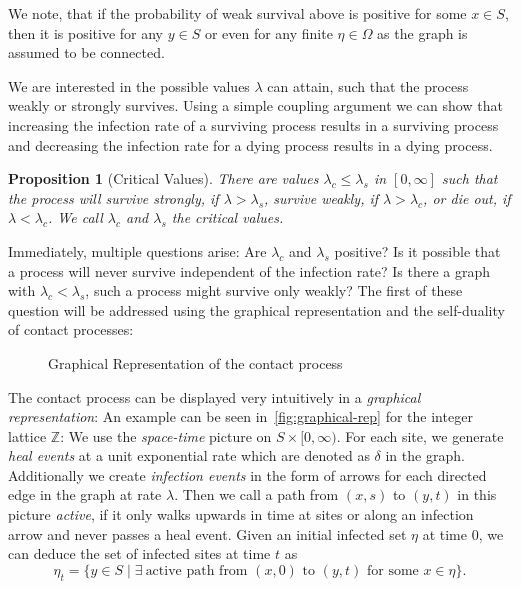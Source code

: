 \documentclass[a4paper,11pt]{amsart}
\theoremstyle{theorem}
\newtheorem{proposition}[theorem]{Proposition}
\theoremstyle{definition}
\newcommand{\Z}{\mathbb{Z}}
\begin{document}
We note, that if the probability of weak survival above is positive for some $x\in S$, then it is positive for any $y\in S$ or even for any finite $\eta \in \Omega$ as the graph is assumed to be connected.

We are interested in the possible values $\lambda$ can attain, such that the process weakly or strongly survives.
Using a simple coupling argument we can show that increasing the infection rate of a surviving process results in a surviving process and decreasing the infection rate for a dying process results in a dying process.

\begin{proposition}[Critical Values]
	There are values $\lambda_c \leq \lambda_s$ in $[0,\infty]$ such that the process will survive strongly, if $\lambda > \lambda_s$, survive weakly, if $\lambda > \lambda_c$, or die out, if $\lambda < \lambda_c$.
	We call $\lambda_c$ and $\lambda_s$ the \emph{critical values}.
\end{proposition}


Immediately, multiple questions arise:
Are $\lambda_c$ and $\lambda_s$ positive? Is it possible that a process will never survive independent of the infection rate?
Is there a graph with $\lambda_c < \lambda_s$, such a process might survive only weakly?
The first of these question will be addressed using the graphical representation and the self-duality of contact processes:

\begin{figure}[h]

\caption{Graphical Representation of the contact process}
\label{fig:graphical-rep}
\end{figure}

The contact process can be displayed very intuitively in a \emph{graphical representation}:
An example can be seen in~\autoref{fig:graphical-rep} for the integer lattice $\Z$:
We use the \emph{space-time} picture on $S\times [0,\infty)$. For each site, we generate \emph{heal events} at a unit exponential rate which are denoted as $\delta$ in the graph.
Additionally we create \emph{infection events} in the form of arrows for each directed edge in the graph at rate $\lambda$.
Then we call a path from $(x,s)$ to $(y,t)$ in this picture \emph{active}, if it only walks upwards in time at sites or along an infection arrow and never passes a heal event.
Given an initial infected set $\eta$ at time $0$, we can deduce the set of infected sites at time $t$ as $$\eta_t = \{y\in S\mid \exists\ \text{active path from $(x,0)$ to $(y,t)$ for some $x\in\eta$}\}.$$
\end{document}
